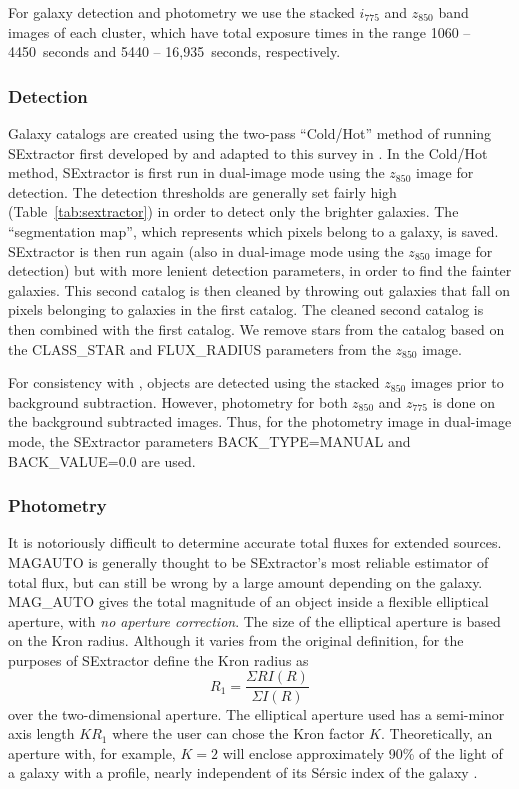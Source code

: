 
For galaxy detection and photometry we use the stacked $i_{775}$ and
$z_{850}$ band images of each cluster, which have total exposure times
in the range 1060 -- 4450~seconds and 5440 -- 16,935~seconds,
respectively. 

\subsubsection{Detection}

Galaxy catalogs are created using the two-pass ``Cold/Hot'' method of
running {\sc SExtractor} first developed by \citet{rix04a} and adapted
to this survey in \citet{meyers11a}.  In the Cold/Hot method, {\sc
SExtractor} is first run in dual-image mode using the $z_{850}$ image
for detection. The detection thresholds are generally set fairly high
(Table~\ref{tab:sextractor}) in order to detect only the brighter
galaxies. The ``segmentation map'', which represents which pixels
belong to a galaxy, is saved. {\sc SExtractor} is then run again (also
in dual-image mode using the $z_{850}$ image for detection) but with
more lenient detection parameters, in order to find the fainter
galaxies. This second catalog is then cleaned by throwing out galaxies
that fall on pixels belonging to galaxies in the first catalog. The
cleaned second catalog is then combined with the first catalog.  We
remove stars from the catalog based on the CLASS\_STAR and
FLUX\_RADIUS parameters from the $z_{850}$ image.

For consistency with \citet{meyers11a}, objects are detected using the
stacked $z_{850}$ images prior to background subtraction. However,
photometry for both $z_{850}$ and $z_{775}$ is done on the background
subtracted images. Thus, for the photometry image in dual-image mode,
the {\sc SExtractor} parameters BACK\_TYPE=MANUAL and BACK\_VALUE=0.0
are used.

\subsubsection{Photometry}

It is notoriously difficult to determine accurate total fluxes for
extended sources. MAGAUTO is generally thought to be {\sc
SExtractor}'s most reliable estimator of total flux, but can still be
wrong by a large amount depending on the galaxy.  MAG\_AUTO gives the
total magnitude of an object inside a flexible elliptical aperture,
with \emph{no aperture correction}. The size of the elliptical
aperture is based on the Kron radius. Although it varies from the
original definition, for the purposes of {\sc
SExtractor} \citet{bertin96a} define the Kron radius as
\begin{equation} \label{eq:kron}
R_1 = \frac{\Sigma R I(R)}{\Sigma I(R)}
\end{equation}
over the two-dimensional aperture. The elliptical aperture used has a
semi-minor axis length $KR_1$ where the user can chose the Kron factor
$K$. Theoretically, an aperture with, for example, $K=2$ will enclose
approximately 90\% of the light of a galaxy with a \citet{sersic68a}
profile, nearly independent of its S{\'e}rsic index of the
galaxy \citep{graham05a}.

